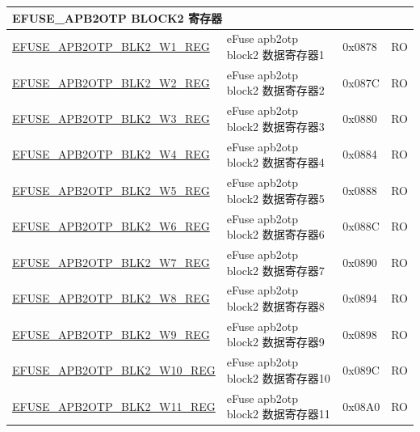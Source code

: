 \begin{longtable}{ | p{7cm} | p{6cm} | p{1.2cm} | p{1.5cm} | }
\multicolumn{4}{|l|}{\textbf{EFUSE\_APB2OTP BLOCK2 寄存器}} \\ \hline
\hyperref[regdesc:EFUSEAPB2OTPBLK2WNREG]{EFUSE\_APB2OTP\_BLK2\_W1\_REG} & eFuse apb2otp block2 数据寄存器1 & 0x0878 & RO \\\hline
\hyperref[regdesc:EFUSEAPB2OTPBLK2WNREG]{EFUSE\_APB2OTP\_BLK2\_W2\_REG} & eFuse apb2otp block2 数据寄存器2 & 0x087C & RO \\\hline
\hyperref[regdesc:EFUSEAPB2OTPBLK2WNREG]{EFUSE\_APB2OTP\_BLK2\_W3\_REG} & eFuse apb2otp block2 数据寄存器3 & 0x0880 & RO \\\hline
\hyperref[regdesc:EFUSEAPB2OTPBLK2WNREG]{EFUSE\_APB2OTP\_BLK2\_W4\_REG} & eFuse apb2otp block2 数据寄存器4 & 0x0884 & RO \\\hline
\hyperref[regdesc:EFUSEAPB2OTPBLK2WNREG]{EFUSE\_APB2OTP\_BLK2\_W5\_REG} & eFuse apb2otp block2 数据寄存器5 & 0x0888 & RO \\\hline
\hyperref[regdesc:EFUSEAPB2OTPBLK2WNREG]{EFUSE\_APB2OTP\_BLK2\_W6\_REG} & eFuse apb2otp block2 数据寄存器6 & 0x088C & RO \\\hline
\hyperref[regdesc:EFUSEAPB2OTPBLK2WNREG]{EFUSE\_APB2OTP\_BLK2\_W7\_REG} & eFuse apb2otp block2 数据寄存器7 & 0x0890 & RO \\\hline
\hyperref[regdesc:EFUSEAPB2OTPBLK2WNREG]{EFUSE\_APB2OTP\_BLK2\_W8\_REG} & eFuse apb2otp block2 数据寄存器8 & 0x0894 & RO \\\hline
\hyperref[regdesc:EFUSEAPB2OTPBLK2WNREG]{EFUSE\_APB2OTP\_BLK2\_W9\_REG} & eFuse apb2otp block2 数据寄存器9 & 0x0898 & RO \\\hline
\hyperref[regdesc:EFUSEAPB2OTPBLK2WNREG]{EFUSE\_APB2OTP\_BLK2\_W10\_REG} & eFuse apb2otp block2 数据寄存器10 & 0x089C & RO \\\hline
\hyperref[regdesc:EFUSEAPB2OTPBLK2WNREG]{EFUSE\_APB2OTP\_BLK2\_W11\_REG} & eFuse apb2otp block2 数据寄存器11 & 0x08A0 & RO \\ \hline


\end{longtable}
